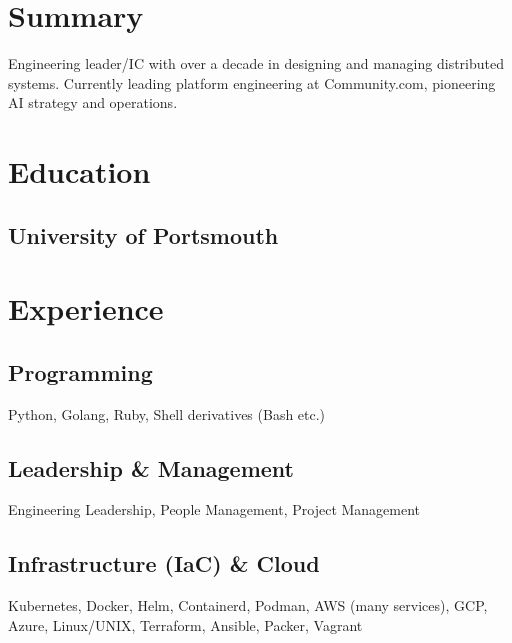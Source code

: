 \documentclass[]{resume}
\begin{document}
\hfill
\begin{minipage}[t]{0.33\textwidth}


\section{Summary}
Engineering leader/IC with over a decade in designing and managing distributed systems. Currently leading platform engineering at Community.com, pioneering AI strategy and operations. 
\sectionsep


\section{Education}

\subsection{University of Portsmouth}
\sectionsep


\section{Experience}
\subsection{Programming}
Python, Golang, Ruby, Shell derivatives (Bash etc.)
\sectionsep

\subsection{Leadership \& Management}
Engineering Leadership, People Management, Project Management

\subsection{Infrastructure (IaC) \& Cloud}
Kubernetes, Docker, Helm, Containerd, Podman, AWS (many services), GCP, Azure, Linux/UNIX, Terraform, Ansible, Packer, Vagrant
\sectionsep


\end{minipage}
\end{document}

